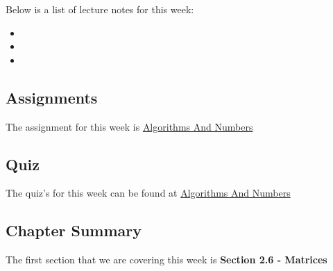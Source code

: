 \noindent Below is a list of lecture notes for this week:

\begin{itemize}
    \item {}
    \item {}
    \item {}
\end{itemize}

\subsection{Assignments}

The assignment for this week is \href{https://applied.cs.colorado.edu/mod/quiz/view.php?id=51642}{Algorithms And Numbers}  

\subsection{Quiz}

The quiz's for this week can be found at \href{https://applied.cs.colorado.edu/mod/quiz/view.php?id=51641}{Algorithms And Numbers}  

\subsection{Chapter Summary}

The first section that we are covering this week is \textbf{Section 2.6 - Matrices}

